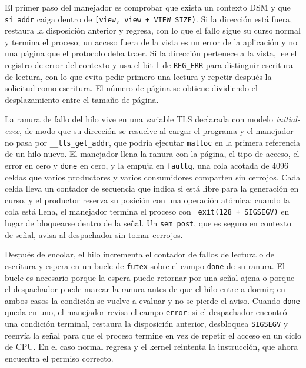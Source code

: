 El primer paso del manejador es comprobar que exista un contexto DSM y que \texttt{si\_addr} caiga dentro de \texttt{[view, view + VIEW\_SIZE)}. Si la dirección está fuera, restaura la disposición anterior y regresa, con lo que el fallo sigue su curso normal y termina el proceso; un acceso fuera de la vista es un error de la aplicación y no una página que el protocolo deba traer. Si la dirección pertenece a la vista, lee el registro de error del contexto y usa el bit 1 de \texttt{REG\_ERR} para distinguir escritura de lectura, con lo que evita pedir primero una lectura y repetir después la solicitud como escritura. El número de página se obtiene dividiendo el desplazamiento entre el tamaño de página.

La ranura de fallo del hilo vive en una variable TLS declarada con modelo \textit{initial-exec}, de modo que su dirección se resuelve al cargar el programa y el manejador no pasa por \texttt{\_\_tls\_get\_addr}, que podría ejecutar \texttt{malloc} en la primera referencia de un hilo nuevo. El manejador llena la ranura con la página, el tipo de acceso, el error en cero y \texttt{done} en cero, y la empuja en \texttt{faultq}, una cola acotada de 4096 celdas que varios productores y varios consumidores comparten sin cerrojos. Cada celda lleva un contador de secuencia que indica si está libre para la generación en curso, y el productor reserva su posición con una operación atómica; cuando la cola está llena, el manejador termina el proceso con \texttt{\_exit(128 + SIGSEGV)} en lugar de bloquearse dentro de la señal. Un \texttt{sem\_post}, que es seguro en contexto de señal, avisa al despachador sin tomar cerrojos.

Después de encolar, el hilo incrementa el contador de fallos de lectura o de escritura y espera en un bucle de \texttt{futex} sobre el campo \texttt{done} de su ranura. El bucle es necesario porque la espera puede retornar por una señal ajena o porque el despachador puede marcar la ranura antes de que el hilo entre a dormir; en ambos casos la condición se vuelve a evaluar y no se pierde el aviso. Cuando \texttt{done} queda en uno, el manejador revisa el campo \texttt{error}: si el despachador encontró una condición terminal, restaura la disposición anterior, desbloquea \texttt{SIGSEGV} y reenvía la señal para que el proceso termine en vez de repetir el acceso en un ciclo de CPU. En el caso normal regresa y el kernel reintenta la instrucción, que ahora encuentra el permiso correcto.

